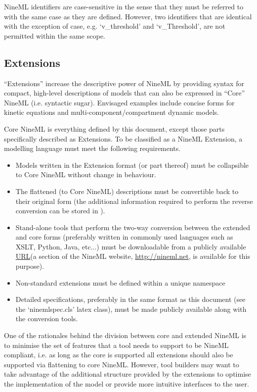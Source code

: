 \documentclass[draftspec]{ninemlspec}
\newcommand{\URL}{\href{http://en.wikipedia.org/wiki/Uniform_resource_locator}{URL}\xspace}
\newcommand{\Annotations}{\defRef{\textbf{\class{Annotations}}\xspace}{sec:Annotations}}
\begin{document}
NineML identifiers are case-sensitive in the sense that they must be referred to with the same case as they are defined. However, two identifiers that are identical with the exception of case, e.g. `v\_threshold' and `v\_Threshold', are not permitted within the same scope.

\subsection{Extensions}
\label{sec:extensions}

``Extensions'' increase the descriptive power of NineML by providing syntax for compact, high-level descriptions of models that can also be expressed in ``Core'' NineML (i.e. syntactic sugar). Envisaged examples include concise forms for kinetic equations and multi-component/compartment dynamic models. 

Core NineML is everything defined by this document, except those parts specifically described as Extensions. To be classified as a NineML Extension, a modelling language must meet the following requirements.
\begin{itemize}
\item Models written in the Extension format (or part thereof) must be collapsible to Core NineML without change in behaviour.
\item The flattened (to Core NineML) descriptions must be convertible back to their original form (the additional information required to perform the reverse conversion can be stored in \Annotations).
\item Stand-alone tools that perform the two-way conversion between the extended and core forms (preferably written in commonly used languages such as XSLT, Python, Java, etc...) must be downloadable from a publicly available \URL (a section of the NineML website, \href{http://nineml.net}{http://nineml.net}, is available for this purpose).
\item Non-standard extensions must be defined within a unique namespace
\item Detailed specifications, preferably in the same format as this document (see the `ninemlspec.cls' latex class), must be made publicly available along with the conversion tools.
 \label{item:collapsible}
\end{itemize}

One of the rationales behind the division between core and extended NineML is to minimise the set of features that a tool needs to support to be NineML compliant, i.e. as long as the core is supported all extensions should also be supported via flattening to core NineML. However, tool builders may want to take advantage of the additional structure provided by the extensions to optimise the implementation of the model or provide more intuitive interfaces to the user. 
\end{document}
